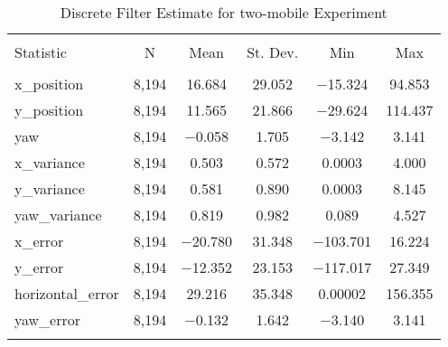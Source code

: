 
\begin{table}[h] \centering 
  \caption{Discrete Filter Estimate for two-mobile Experiment} 
  \label{tab:two_mobile_discrete_summary} 
\begin{tabular}{@{\extracolsep{5pt}}lccccc} 
\\[-1.8ex]\hline 
\hline \\[-1.8ex] 
Statistic & \multicolumn{1}{c}{N} & \multicolumn{1}{c}{Mean} & \multicolumn{1}{c}{St. Dev.} & \multicolumn{1}{c}{Min} & \multicolumn{1}{c}{Max} \\ 
\hline \\[-1.8ex] 
x\_position & 8,194 & 16.684 & 29.052 & $-$15.324 & 94.853 \\ 
y\_position & 8,194 & 11.565 & 21.866 & $-$29.624 & 114.437 \\ 
yaw & 8,194 & $-$0.058 & 1.705 & $-$3.142 & 3.141 \\ 
x\_variance & 8,194 & 0.503 & 0.572 & 0.0003 & 4.000 \\ 
y\_variance & 8,194 & 0.581 & 0.890 & 0.0003 & 8.145 \\ 
yaw\_variance & 8,194 & 0.819 & 0.982 & 0.089 & 4.527 \\ 
x\_error & 8,194 & $-$20.780 & 31.348 & $-$103.701 & 16.224 \\ 
y\_error & 8,194 & $-$12.352 & 23.153 & $-$117.017 & 27.349 \\ 
horizontal\_error & 8,194 & 29.216 & 35.348 & 0.00002 & 156.355 \\ 
yaw\_error & 8,194 & $-$0.132 & 1.642 & $-$3.140 & 3.141 \\ 
\hline \\[-1.8ex] 
\end{tabular} 
\end{table} 
